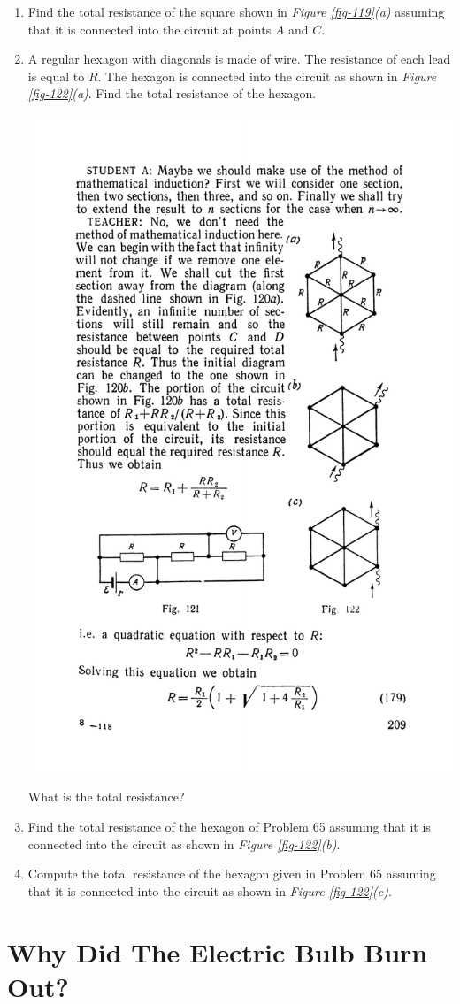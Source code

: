 \documentclass[a4paper,sfsidenotes]{tufte-book}
\begin{document}
\begin{enumerate}[resume=problems]
\item Find the total resistance of the square shown in \emph{Figure \ref{fig-119}(a)} assuming that it is connected into the circuit at points $A$ and $C$.
\item A regular hexagon with diagonals is made of wire. The resistance of each lead is equal to $R$. The hexagon is connected into the circuit as shown in \emph{Figure \ref{fig-122}(a)}. Find the total resistance of the hexagon.

\begin{marginfigure}[-2cm]
\centering
\includegraphics[width=.7\linewidth]{fig-122a}
\caption{ What is the total resistance?}
\label{fig-122}
\end{marginfigure}

\item Find the total resistance of the hexagon of Problem 65 assuming that it is connected into the circuit as shown in \emph{Figure \ref{fig-122}(b)}.
\item Compute the total resistance of the hexagon given in Problem 65 assuming that it is connected into the circuit as shown in \emph{Figure \ref{fig-122}(c)}.
\end{enumerate}

\chapter{Why Did The Electric Bulb Burn Out?}
\label{ch-30}
\end{document}
